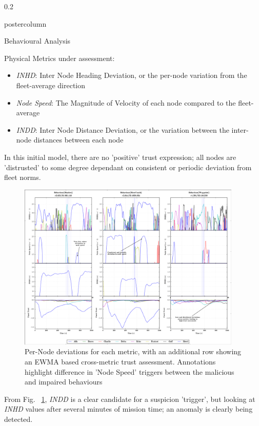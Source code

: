 \documentclass[final,hyperref={pdfpagelabels=false}]{beamer}
\def\colwidth{0.2\linewidth}
\begin{document}
\begin{frame}[fragile]
\begin{columns}[T]
\begin{column}{\colwidth}
\begin{beamercolorbox}[center,wd=\textwidth]{postercolumn}
\begin{minipage}[T]{.98\textwidth}
{\begin{block}{Behavioural Analysis}
							\vspace{0.3\baselineskip}
							
							Physical Metrics under assessment:
							\begin{itemize}
								\item \emph{INHD}: Inter Node Heading Deviation, or the per-node variation from the fleet-average direction
								\item \emph{Node Speed}: The Magnitude of Velocity of each node compared to the fleet-average
								\item \emph{INDD}: Inter Node Distance Deviation, or the variation between the inter-node distances between each node
							\end{itemize}
							
							\vspace{0.3\baselineskip}
							
							In this initial model, there are no 'positive' trust expression; all nodes are 'distrusted' to some degree dependant on consistent or periodic deviation from fleet norms.
							
							\begin{figure}
								\includegraphics[width=0.95\textwidth]{figures/Bad_Alfa_Fusion}
								\caption{Per-Node deviations for each metric, with an additional row showing an EWMA based cross-metric trust assessment. Annotations highlight difference in 'Node Speed' triggers between the malicious and impaired behaviours }
								\label{fig:Bad_Alfa_Fusion}
							\end{figure}
							
              From Fig. ~\ref{fig:Bad_Alfa_Fusion}, \emph{INDD} is a clear candidate for a suspicion 'trigger', but looking at \emph{INHD} values after several minutes of mission time; an anomaly is clearly being detected. 
							

\end{block}}
\end{minipage}
\end{beamercolorbox}
\end{column}
\end{columns}
\end{frame}
\end{document}
